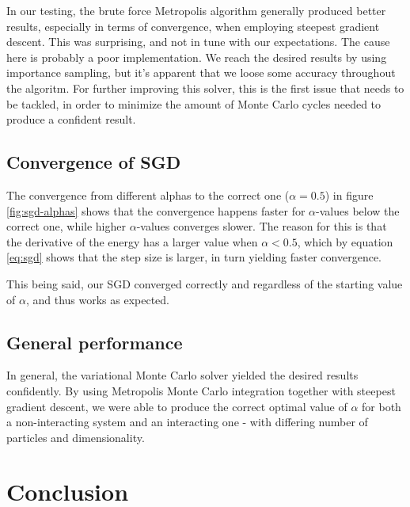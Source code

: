 \documentclass[
]{article}
\begin{document}
In our testing, the brute force Metropolis algorithm generally produced
better results, especially in terms of convergence, when employing
steepest gradient descent. This was surprising, and not in tune with our
expectations. The cause here is probably a poor implementation. We reach
the desired results by using importance sampling, but it's apparent that
we loose some accuracy throughout the algoritm. For further improving
this solver, this is the first issue that needs to be tackled, in order
to minimize the amount of Monte Carlo cycles needed to produce a
confident result.

\hypertarget{convergence-of-sgd}{%
\subsection*{Convergence of SGD}\label{convergence-of-sgd}}

The convergence from different alphas to the correct one
(\(\alpha = 0.5\)) in figure \ref{fig:sgd-alphas} shows that the
convergence happens faster for \(\alpha\)-values below the correct one,
while higher \(\alpha\)-values converges slower. The reason for this is
that the derivative of the energy has a larger value when
\(\alpha < 0.5\), which by equation \eqref{eq:sgd} shows that the step
size is larger, in turn yielding faster convergence.

This being said, our SGD converged correctly and regardless of the
starting value of \(\alpha\), and thus works as expected.

\hypertarget{general-performance}{%
\subsection*{General performance}\label{general-performance}}

In general, the variational Monte Carlo solver yielded the desired
results confidently. By using Metropolis Monte Carlo integration
together with steepest gradient descent, we were able to produce the
correct optimal value of \(\alpha\) for both a non-interacting system
and an interacting one - with differing number of particles and
dimensionality.

\hypertarget{conclusion}{%
\section{Conclusion}\label{conclusion}}
\end{document}
